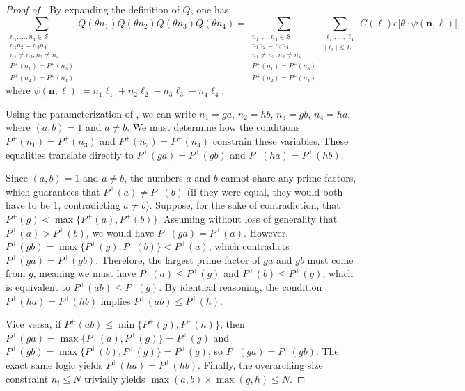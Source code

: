 \documentclass[12pt]{amsart}
\renewcommand{\le}{\leqslant}
\renewcommand{\leq}{\leqslant}
\numberwithin{equation}{section}
\theoremstyle{plain}
\theoremstyle{definition}
\renewcommand{\l}{\ell}
\newcommand{\CS}{\mathcal{S}}
\begin{document}
	\begin{proof}[Proof of ]
		By expanding the definition of $Q$, one has:
		\begin{equation}\label{eq:0 proof cond 2}
			\sum_{\substack{n_1,\dots,n_4 \in \CS \\ n_1n_2=n_3n_4 \\ n_1 \ne n_3,n_2 \ne n_4 \\ P^+(n_1)=P^+(n_3) \\ P^+(n_2) = P^+(n_4)}}Q(\theta n_1)Q(\theta n_2)\overline{Q(\theta n_3)Q(\theta n_4)} = \sum_{\substack{n_1,\dots,n_4 \in \CS \\ n_1n_2=n_3n_4 \\ n_1 \ne n_3,n_2 \ne n_4 \\ P^+(n_1)=P^+(n_3) \\ P^+(n_2) = P^+(n_4) }}\sum_{\substack{\l_1,\dots,\l_4 \\ |\l_i| \leq L}} C(\bm{\l}) e\Big[\theta \cdot \psi(\bm{n},\bm{\l})\Big],
		\end{equation}
		where $\psi(\bm{n},\bm{\l})	:= n_1\l_1+n_2\l_2-n_3\l_3-n_4\l_4.$
		
		Using the parameterization of , we can write $n_1 = ga$, $n_2 = hb$, $n_3 = gb$, $n_4 = ha$, where $(a,b) = 1$ and $a \ne b$. We must determine how the conditions $P^+(n_1) = P^+(n_3)$ and $P^+(n_2) = P^+(n_4)$ constrain these variables. These equalities translate directly to $P^+(ga) = P^+(gb)$ and $P^+(ha) = P^+(hb)$. 
		
		Since $(a,b) = 1$ and $a \ne b$, the numbers $a$ and $b$ cannot share any prime factors, which guarantees that $P^+(a) \ne P^+(b)$ (if they were equal, they would both have to be $1$, contradicting $a \ne b$). Suppose, for the sake of contradiction, that $P^+(g) < \max\{P^+(a), P^+(b)\}$. Assuming without loss of generality that $P^+(a) > P^+(b)$, we would have $P^+(ga) = P^+(a)$. However, $P^+(gb) = \max\{P^+(g), P^+(b)\} < P^+(a)$, which contradicts $P^+(ga) = P^+(gb)$. Therefore, the largest prime factor of $ga$ and $gb$ must come from $g$, meaning we must have $P^+(a) \le P^+(g)$ and $P^+(b) \le P^+(g)$, which is equivalent to $P^+(ab) \le P^+(g)$. By identical reasoning, the condition $P^+(ha) = P^+(hb)$ implies $P^+(ab) \le P^+(h)$. 
		
		Vice versa, if $P^+(ab) \le \min\{P^+(g), P^+(h)\}$, then $P^+(ga) = \max\{P^+(a), P^+(g)\} = P^+(g)$ and $P^+(gb) = \max\{P^+(b), P^+(g)\} = P^+(g)$, so $P^+(ga) = P^+(gb)$. The exact same logic yields $P^+(ha) = P^+(hb)$. Finally, the overarching size constraint $n_i \le N$ trivially yields $\max(a,b) \times \max(g,h) \leq N$.
		

\end{proof}
\end{document}
